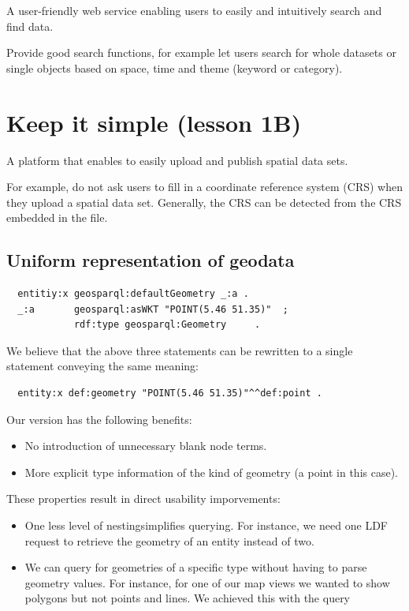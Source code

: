 \documentclass[a4paper]{scrartcl}
\begin{document}
A user-friendly web service enabling users to easily and intuitively
search and find data.

Provide good search functions, for example let users search for whole
datasets or single objects based on space, time and theme (keyword or
category).


\section{Keep it simple (lesson 1B)}

A platform that enables to easily upload and publish spatial data
sets.

For example, do not ask users to fill in a coordinate reference system
(CRS) when they upload a spatial data set. Generally, the CRS can be
detected from the CRS embedded in the file.

\subsection{Uniform representation of geodata}

\begin{verbatim}
  entitiy:x geosparql:defaultGeometry _:a .
  _:a       geosparql:asWKT "POINT(5.46 51.35)"  ;
            rdf:type geosparql:Geometry     .
\end{verbatim}

We believe that the above three statements can be rewritten to a
single statement conveying the same meaning:

\begin{verbatim}
  entity:x def:geometry "POINT(5.46 51.35)"^^def:point .
\end{verbatim}

Our version has the following benefits:

\begin{itemize}

\item No introduction of unnecessary blank node terms.

\item More explicit type information of the kind of geometry (a point
  in this case).

\end{itemize}

These properties result in direct usability imporvements:

\begin{itemize}
  
\item One less level of nestingsimplifies querying.  For instance, we
  need one LDF request to retrieve the geometry of an entity instead
  of two.

\item We can query for geometries of a specific type without having to
  parse geometry values.  For instance, for one of our map views we
  wanted to show polygons but not points and lines.  We achieved this
  with the query%

\end{itemize}
\end{document}
